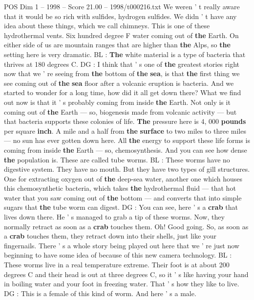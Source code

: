 \begin{textsample}{POS Dim 1 – 1998 – Score 21.00 – 1998/t000216.txt}
We weren ' t really aware that it would be so rich with sulfides, hydrogen sulfides.
We didn ' t have any idea about these things, which we call chimneys.
This is one of these hydrothermal vents.
Six hundred degree F water coming out of \textbf{the} Earth.
On either side of us are mountain ranges that are higher than \textbf{the} Alps, so \textbf{the} setting here is very dramatic.
BL : \textbf{The} white material is a type of bacteria that thrives at 180 degrees C.
DG : I think that ' s one of \textbf{the} greatest stories right now that we ' re seeing from \textbf{the} bottom of \textbf{the} \textbf{sea}, is that \textbf{the} first thing we see coming out of \textbf{the} \textbf{sea} floor after a volcanic eruption is bacteria.
And we started to wonder for a long time, how did it all get down there?
What we find out now is that it ' s probably coming from inside \textbf{the} Earth.
Not only is it coming out of \textbf{the} Earth — so, biogenesis made from volcanic activity — but that bacteria supports these colonies of life. \textbf{The} pressure here is 4, 000 \textbf{pounds} per square \textbf{inch}.
A mile and a half from \textbf{the} \textbf{surface} to two miles to three miles — no sun has ever gotten down here.
All \textbf{the} energy to support these life forms is coming from inside \textbf{the} Earth — so, chemosynthesis.
And you can see how dense \textbf{the} population is.
These are called tube worms.
BL : These worms have no digestive system.
They have no mouth.
But they have two types of gill structures.
One for extracting oxygen out of \textbf{the} deep-sea water, another one which houses this chemosynthetic bacteria, which takes \textbf{the} hydrothermal fluid — that hot water that you saw coming out of \textbf{the} bottom — and converts that into simple sugars that \textbf{the} tube worm can digest.
DG : You can see, here ' s a \textbf{crab} that lives down there.
He ' s managed to grab a tip of these worms.
Now, they normally retract as soon as a \textbf{crab} touches them.
Oh!
Good going.
So, as soon as a \textbf{crab} touches them, they retract down into their shells, just like your fingernails.
There ' s a whole story being played out here that we ' re just now beginning to have some idea of because of this new camera technology.
BL : These worms live in a real temperature extreme.
Their foot is at about 200 degrees C and their head is out at three degrees C, so it ' s like having your hand in boiling water and your foot in freezing water.
That ' s how they like to live.
DG : This is a female of this kind of worm.
And here ' s a male.

\end{textsample}
